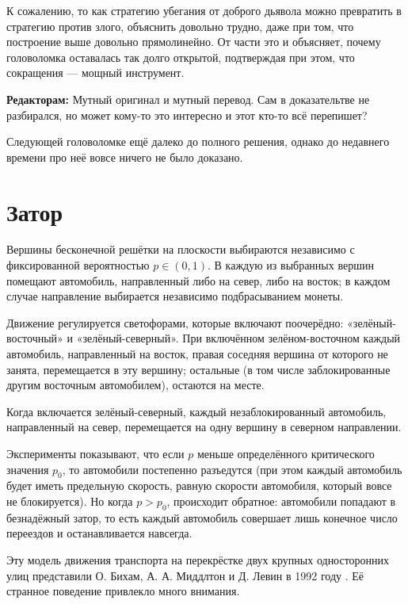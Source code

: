 К сожалению, то как стратегию убегания от доброго дьявола можно превратить в стратегию против злого, объяснить довольно трудно, даже при том, что построение выше довольно прямолинейно.
От части это и объясняет, почему головоломка оставалась так долго открытой, подтверждая при этом, что сокращения --- мощный инструмент.

\begin{addedbytheeditors}
\textbf{Редакторам:} Мутный оригинал и мутный перевод. Сам в доказательтве не разбирался, но может кому-то это интересно и этот кто-то всё перепишет?
\end{addedbytheeditors}


\medskip

Следующей головоломке ещё далеко до полного решения,
однако до недавнего времени про неё вовсе ничего не было доказано.

\section*{Затор}

Вершины бесконечной решётки на плоскости выбираются независимо с
фиксированной вероятностью $p\in (0,1)$.
В каждую из выбранных вершин
помещают автомобиль, направленный либо на север, либо на восток;
в каждом случае направление выбирается независимо подбрасыванием монеты.

Движение регулируется светофорами, которые включают поочерёдно:
«зелёный-восточный» и «зелёный-северный».
При включённом
зелёном-восточном каждый автомобиль, направленный на восток, правая
соседняя вершина от которого не занята, перемещается в эту вершину;
остальные (в том числе заблокированные другим восточным автомобилем),
остаются на месте.

Когда включается зелёный-северный, каждый незаблокированный
автомобиль, направленный на север, перемещается на одну вершину в
северном направлении.

Эксперименты показывают, что если $p$ меньше определённого
критического значения $p_0$, то автомобили постепенно разъедутся
(при этом каждый автомобиль будет иметь предельную скорость,
равную скорости автомобиля, который вовсе не блокируется).
Но когда
$p> p_0$, происходит обратное: автомобили попадают в безнадёжный
затор, то есть каждый автомобиль совершает лишь конечное число переездов
и останавливается навсегда.

Эту модель движения транспорта на перекрёстке двух крупных односторонних улиц представили О. Бихам, А. А. Миддлтон и Д. Левин в 1992 году \cite{6}.
Её странное поведение привлекло много внимания.

